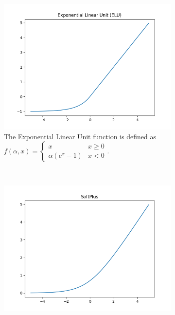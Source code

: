 \begin{figure}[h!]
	\centering
	\begin{subfigure}[t]{0.5\textwidth}
		\centering
		\includegraphics[width=\textwidth]{img/methodology_neuralNetwork_activationFunction_elu.png}
		\caption{The Exponential Linear Unit function is defined as $f(\alpha, x) = \begin{cases} x & x \geq 0 \\ \alpha (e^x - 1) & x < 0 \end{cases}$.}
	\end{subfigure}%
	~ 
	\begin{subfigure}[t]{0.5\textwidth}
		\centering
		\includegraphics[width=\textwidth]{img/methodology_neuralNetwork_activationFunction_softplus.png}

\end{subfigure}
\end{figure}
